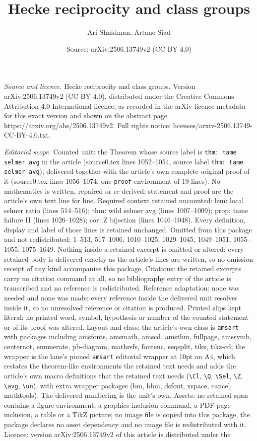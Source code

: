 \documentclass[10pt,a4paper]{amsart}
\title[Hecke reciprocity and class groups]{Hecke reciprocity and class groups}
\author{Ari Shnidman, Artane Siad}
\date{Source: arXiv:2506.13749v2 (CC BY 4.0)}
\begin{document}
\maketitle

\noindent\emph{Source and licence.} Hecke reciprocity and class groups. Version arXiv:2506.13749v2 (CC BY 4.0), distributed under the Creative Commons Attribution 4.0 International licence, as recorded in the arXiv licence metadata for this exact version and shown on the abstract page https://arxiv.org/abs/2506.13749v2. Full rights notice: licenses/arxiv-2506.13749-CC-BY-4.0.txt.\par\smallskip

\noindent\textit{Editorial scope.} Counted unit: the Theorem whose source label is \texttt{thm: tame selmer avg} in the article (source0.tex lines 1052--1054, source label \texttt{thm: tame selmer avg}), delivered together with the article's own complete original proof of it (source0.tex lines 1056--1074, one \texttt{proof} environment of 19 lines). No mathematics is written, repaired or re-derived: statement and proof are the article's own text line for line. Required context retained uncounted: lem: local selmer ratio (lines 514--516); thm: wild selmer avg (lines 1007--1009); prop: tame failure II (lines 1026--1028); cor: Z bijection (lines 1046--1048). Every definition, display and label of those lines is retained unchanged. Omitted from this package and not redistributed: 1--513, 517--1006, 1010--1025, 1029--1045, 1049--1051, 1055--1055, 1075--1649. Nothing inside a retained excerpt is omitted or altered: every retained body is delivered exactly as the article's lines are written, so no omission receipt of any kind accompanies this package. Citations: the retained excerpts carry no citation command at all, so no bibliography entry of the article is transcribed and no reference is redistributed. Reference adaptation: none was needed and none was made; every reference inside the delivered unit resolves inside it, so no unresolved reference or citation is produced. Printed slips kept literal: no printed word, symbol, hypothesis or number of the counted statement or of its proof was altered. Layout and class: the article's own class is \texttt{amsart} with packages including amsfonts, amsmath, amscd, amsthm, fullpage, amssymb, centernot, enumerate, pb-diagram, mathrsfs, fontenc, seqsplit, tikz, tikz-cd; the wrapper is the lane's pinned \texttt{amsart} editorial wrapper at 10pt on A4, which restates the theorem-like environments the retained text needs and adds the article's own macro definitions that the retained text needs (\texttt{\textbackslash Cl}, \texttt{\textbackslash Q}, \texttt{\textbackslash Sel}, \texttt{\textbackslash Z}, \texttt{\textbackslash avg}, \texttt{\textbackslash un}), with extra wrapper packages (bm, bbm, dsfont, xspace, cancel, mathtools). The delivered numbering is the unit's own. Assets: no retained span contains a figure environment, a graphics-inclusion command, a PDF-page inclusion, a table or a TikZ picture; no image file is copied into this package, the package declares no asset dependency and no image file is redistributed with it. Licence: version arXiv:2506.13749v2 of this article is distributed under the 
\end{document}
